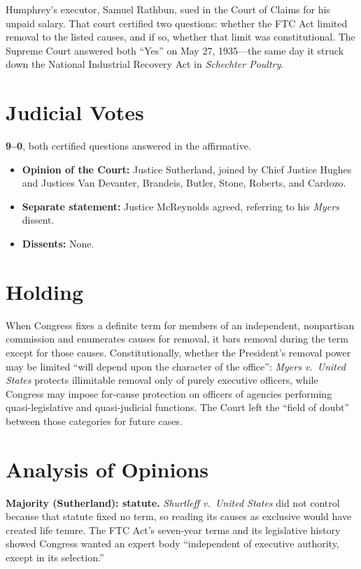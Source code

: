 \documentclass[12pt]{article}
\begin{document}
Humphrey's executor, Samuel Rathbun, sued in the Court of Claims for his unpaid salary. That court certified two questions: whether the FTC Act limited removal to the listed causes, and if so, whether that limit was constitutional. The Supreme Court answered both ``Yes'' on May 27, 1935---the same day it struck down the National Industrial Recovery Act in \textit{Schechter Poultry}.

\section{Judicial Votes}

\textbf{9--0}, both certified questions answered in the affirmative.
\begin{itemize}
\item \textbf{Opinion of the Court:} Justice Sutherland, joined by Chief Justice Hughes and Justices Van Devanter, Brandeis, Butler, Stone, Roberts, and Cardozo.
\item \textbf{Separate statement:} Justice McReynolds agreed, referring to his \textit{Myers} dissent.
\item \textbf{Dissents:} None.
\end{itemize}

\section{Holding}

When Congress fixes a definite term for members of an independent, nonpartisan commission and enumerates causes for removal, it bars removal during the term except for those causes. Constitutionally, whether the President's removal power may be limited ``will depend upon the character of the office'': \textit{Myers v.\ United States} protects illimitable removal only of purely executive officers, while Congress may impose for-cause protection on officers of agencies performing quasi-legislative and quasi-judicial functions. The Court left the ``field of doubt'' between those categories for future cases.

\section{Analysis of Opinions}

\textbf{Majority (Sutherland): statute.} \textit{Shurtleff v.\ United States} did not control because that statute fixed no term, so reading its causes as exclusive would have created life tenure. The FTC Act's seven-year terms and its legislative history showed Congress wanted an expert body ``independent of executive authority, except in its selection.''
\end{document}
